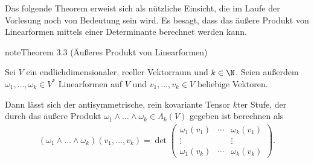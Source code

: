 \documentclass[letterpaper,10pt,german]{jupyterBook}
\begin{document}
\sphinxAtStartPar
Das folgende Theorem erweist sich als nützliche Einsicht, die im Laufe der Vorlesung noch von Bedeutung sein wird.
Es besagt, dass das äußere Produkt von Linearformen mittels einer Determinante berechnet werden kann.
\label{vektoranalysis/tensor:theorem-37}
\begin{sphinxadmonition}{note}{Theorem 3.3 (Äußeres Produkt von Linearformen)}



\sphinxAtStartPar
Sei \(V\) ein endlich\sphinxhyphen{}dimensionaler, reeller Vektorraum und \(k \in \N\).
Seien außerdem \(\omega_1, \ldots, \omega_k \in V^\ast\) Linearformen auf \(V\) und \(v_1, \ldots, v_k \in V\) beliebige Vektoren.

\sphinxAtStartPar
Dann lässt sich der antisymmetrische, rein kovariante Tensor \(k\)\sphinxhyphen{}ter Stufe, der durch das äußere Produkt \(\omega_1 \wedge \ldots \wedge \omega_k \in \Lambda_k(V)\) gegeben ist berechnen als
\begin{equation*}
\begin{split}(\omega_1 \wedge \ldots \wedge \omega_k)(v_1, \ldots, v_k) = \operatorname{det}
\begin{pmatrix}
\omega_1(v_1) & \cdots & \omega_k(v_1)\\
\vdots & & \vdots \\
\omega_1(v_k) & \cdots & \omega_k(v_k)
\end{pmatrix}.\end{split}
\end{equation*}\end{sphinxadmonition}
\end{document}
